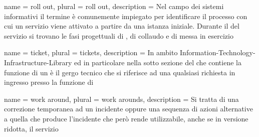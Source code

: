 {
	name		= {roll out},
	plural		= {roll out},
	description = {Nel campo dei sistemi informativi il termine  è comunemente impiegato per identificare il processo con cui un servizio viene attivato a partire da una istanza iniziale. Durante il  del servizio si trovano le fasi progettuali di , di collaudo e di messa in esercizio}
}

{
	name		= {ticket},
	plural		= {tickets},
	description = {In ambito \ac{Information-Technology-Infrastructure-Library} ed in particolare nella sotto sezione del  che contiene la funzione di  un  è il gergo tecnico che si riferisce ad una qualsiasi richiesta in ingresso presso la funzione di }
}

{
	name		= {work around},
	plural		= {work arounds},
	description	= {Si tratta di una correzione temporanea ad un incidente oppure una sequenza di azioni alternative a quella che produce l'incidente che però rende utilizzabile, anche se in versione ridotta, il servizio}
}